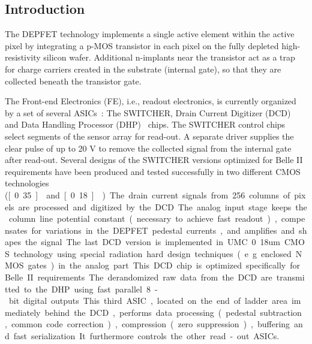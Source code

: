 \subsection{Introduction}
The DEPFET technology implements a single active element within the active pixel by integrating a p-MOS transistor in each pixel on the fully depleted high-resistivity silicon wafer. Additional n-implants near the transistor act as a trap for charge carriers created in the substrate (internal gate), so that they are collected beneath the transistor gate.

The Front-end Electronics (FE), i.e., readout electronics, is currently organized by a set of several ASICs~\cite{Krueger2010337}: The SWITCHER, Drain Current Digitizer (DCD)~\cite{1748-0221-6-01-C01085,5446501} and Data Handling Processor (DHP)~\cite{1748-0221-7-01-C01069} chips.
The SWITCHER control chips select segments of the sensor array for read-out. A separate driver supplies the clear pulse of up to 20 V to remove the collected signal from the internal gate after read-out. Several designs of the SWITCHER versions optimized for Belle II requirements have been produced and tested successfully in two different CMOS technologies (\unit[0.35]{\micron} and \unit[0.18]{\micron}). The drain current signals from 256 columns of pixels are processed and digitized by the DCD.
The analog input stage keeps the column line potential constant (necessary to achieve fast readout), compensates for variations in the DEPFET pedestal currents, and amplifies and shapes the signal. The last DCD version is implemented in UMC 0.18um CMOS technology using special radiation hard design techniques (e.g. enclosed NMOS gates) in the analog part. This DCD chip is optimized specifically for Belle II requirements. The derandomized raw data from the DCD are transmitted to the DHP using fast parallel 8-bit digital outputs.
This third ASIC, located on the end of ladder area immediately behind the DCD, performs data processing (pedestal subtraction, common code correction), compression (zero suppression), buffering and fast serialization. It furthermore controls the other read-out ASICs.


